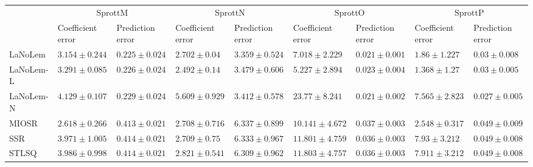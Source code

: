 \begin{table*}
{\begin{tabular}{lllllllll}
 & \multicolumn{2}{c}{SprottM} & \multicolumn{2}{c}{SprottN} & \multicolumn{2}{c}{SprottO} & \multicolumn{2}{c}{SprottP} \\
 & Coefficient error & Prediction error & Coefficient error & Prediction error & Coefficient error & Prediction error & Coefficient error & Prediction error \\
\midrule
LaNoLem & $3.154\pm 0.244$ & $\mathbf{0.225}\pm 0.024$ & $2.702\pm 0.04$ & $\mathbf{3.359}\pm 0.524$ & $7.018\pm 2.229$ & $0.021\pm 0.001$ & $1.86\pm 1.227$ & $0.03\pm 0.008$ \\
LaNoLem-L & $3.291\pm 0.085$ & $0.226\pm 0.024$ & $\mathbf{2.492}\pm 0.14$ & $3.479\pm 0.606$ & $\mathbf{5.227}\pm 2.894$ & $0.023\pm 0.004$ & $\mathbf{1.368}\pm 1.27$ & $0.03\pm 0.005$ \\
LaNoLem-N & $4.129\pm 0.107$ & $0.229\pm 0.024$ & $5.609\pm 0.929$ & $3.412\pm 0.578$ & $23.77\pm 8.241$ & $\mathbf{0.021}\pm 0.002$ & $7.565\pm 2.823$ & $\mathbf{0.027}\pm 0.005$ \\
MIOSR & $\mathbf{2.618}\pm 0.266$ & $0.413\pm 0.021$ & $2.708\pm 0.716$ & $6.337\pm 0.899$ & $10.141\pm 4.672$ & $0.037\pm 0.003$ & $2.548\pm 0.317$ & $0.049\pm 0.009$ \\
SSR & $3.971\pm 1.005$ & $0.414\pm 0.021$ & $2.709\pm 0.75$ & $6.333\pm 0.967$ & $11.801\pm 4.759$ & $0.036\pm 0.003$ & $7.93\pm 3.212$ & $0.049\pm 0.008$ \\
STLSQ & $3.986\pm 0.998$ & $0.414\pm 0.021$ & $2.821\pm 0.541$ & $6.309\pm 0.962$ & $11.803\pm 4.757$ & $0.036\pm 0.003$ & $7.911\pm 3.212$ & $0.049\pm 0.008$ \\

\midrule


\end{tabular}}
\end{table*}
